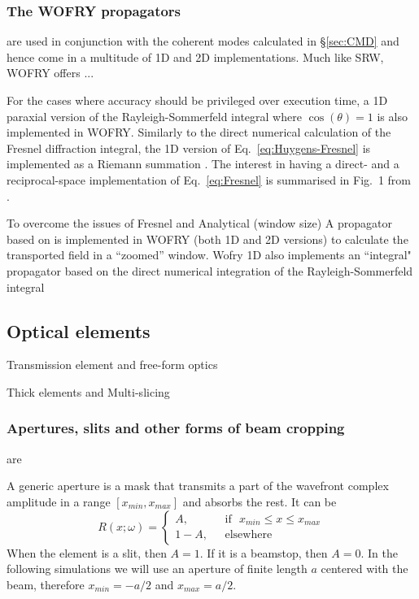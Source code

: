 \documentclass{iucr}              %
\begin{document}
\subsubsection{The WOFRY propagators}
 are used in conjunction with the coherent modes calculated in \S\ref{sec:CMD} and hence come in a multitude of 1D and 2D implementations. Much like SRW, WOFRY offers ...
 
 For the cases where accuracy should be privileged over execution time, a 1D paraxial version of the Rayleigh-Sommerfeld integral where $\cos(\theta)=1$ is also implemented in WOFRY. Similarly to the direct numerical calculation of the Fresnel diffraction integral, the 1D version of Eq.~\ref{eq:Huygens-Fresnel} is implemented as a Riemann summation \cite{srioLBL}. 
  The interest in having a direct- and a reciprocal-space implementation of Eq.~\ref{eq:Fresnel} is summarised in Fig.~1 from \cite{Li2015}.
 
To overcome the issues of Fresnel and Analytical (window size) A propagator based on \cite{schmidt} is implemented in WOFRY (both 1D and 2D versions) to calculate the transported field in a ``zoomed'' window. Wofry 1D also implements an ``integral" propagator based on the direct numerical integration of the  Rayleigh-Sommerfeld integral 

\subsection{Optical elements}\label{sec:OE}

Transmission element and free-form optics

Thick elements and Multi-slicing 

\subsubsection{Apertures, slits and other forms of beam cropping} are

A generic aperture is a mask that transmits a part of the wavefront complex amplitude in a range $[x_{min},x_{max}]$ and absorbs the rest. It can be
\begin{equation}
R(x;\omega) =
\left\{
\begin{matrix}
A,  & \mbox{~~if~~} x_{min} \le x \le x_{max}
\\ 
1 - A, & \mbox{~~elsewhere}
\end{matrix}
\right.
\end{equation}
When the element is a slit, then $A=1$. If it is a beamstop, then $A=0$. In the following simulations we will use an aperture of finite length $a$ centered with the beam, therefore $x_{min}=-a/2$ and $x_{max}=a/2$.
\end{document}
